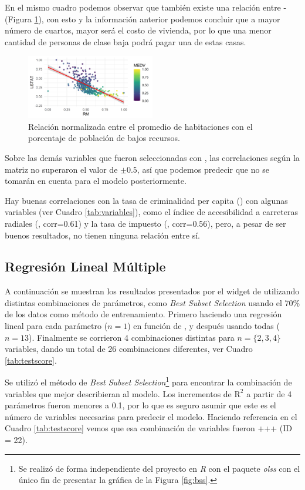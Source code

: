 \documentclass[11pt, letterpaper]{article}
\begin{document}
En el mismo cuadro podemos observar que también existe una relación entre - (Figura \ref{fig:rm_lstat}), con esto y la información anterior podemos concluir que a mayor número de cuartos, mayor será el costo de vivienda, por lo que una menor cantidad de personas de clase baja podrá pagar una de estas casas.

\begin{figure}
\centering
\includegraphics[width=0.5\textwidth]{figuras/rm_lstat.png}
\caption{Relación normalizada entre el promedio de habitaciones con el porcentaje de población de bajos recursos.}
\label{fig:rm_lstat}
\end{figure}

Sobre las demás variables que fueron seleccionadas con , las correlaciones según la matriz no superaron el valor de $\pm 0.5$, así que podemos predecir que no se tomarán en cuenta para el modelo posteriormente.

Hay buenas correlaciones con la tasa de criminalidad per capita () con algunas variables (ver Cuadro \ref{tab:variables}), como el índice de accesibilidad a carreteras radiales (, corr=0.61) y la tasa de impuesto (, corr=0.56), pero, a pesar de ser buenos resultados, no tienen ninguna relación entre sí.

\subsection{Regresión Lineal Múltiple}
A continuación se muestran los resultados presentados por el widget de  utilizando distintas combinaciones de parámetros, como \textit{Best Subset Selection} usando el 70\% de los datos como método de entrenamiento. Primero haciendo una regresión lineal para cada parámetro ($n=1$) en función de , y después usando todas ($n=13$). Finalmente se corrieron 4 combinaciones distintas para $n = \{2,3,4\}$ variables, dando un total de 26 combinaciones diferentes, ver Cuadro \ref{tab:testscore}.

Se utilizó el método de \textit{Best Subset Selection}\footnote{Se realizó de forma independiente del proyecto en \textit{R} con el paquete \textit{olss} con el único fin de presentar la gráfica de la Figura \ref{fig:bss}.} para encontrar la combinación de variables que mejor describieran al modelo. Los incrementos de $\mathrm{R}^2$ a partir de 4 parámetros fueron menores a 0.1, por lo que es seguro asumir que este es el número de variables necesarias para predecir el modelo. Haciendo referencia en el Cuadro \ref{tab:testscore} vemos que esa combinación de variables fueron +++ (ID = 22). 
\end{document}
